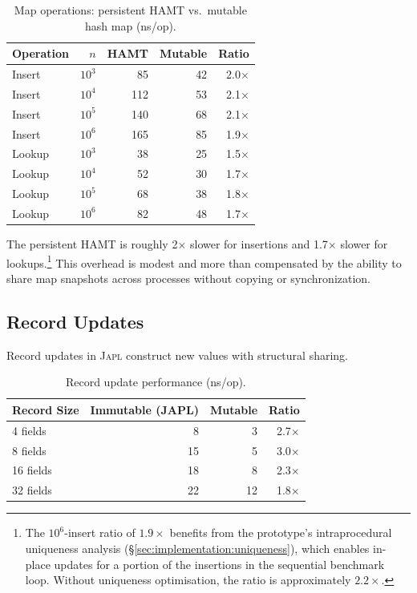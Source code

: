 \documentclass[11pt]{article}
\theoremstyle{definition}
\theoremstyle{remark}
\newcommand{\japl}{\textsc{Japl}}
\begin{document}
\begin{table}[H]
\centering
\caption{Map operations: persistent HAMT vs.\ mutable hash map (ns/op).}
\label{tab:map-benchmark}
\begin{tabular}{lrrrr}
\toprule
\textbf{Operation} & \textbf{$n$} & \textbf{HAMT} & \textbf{Mutable} & \textbf{Ratio} \\
\midrule
Insert    & $10^3$  & 85    & 42    & 2.0$\times$ \\
Insert    & $10^4$  & 112   & 53    & 2.1$\times$ \\
Insert    & $10^5$  & 140   & 68    & 2.1$\times$ \\
Insert    & $10^6$  & 165   & 85    & 1.9$\times$ \\
Lookup    & $10^3$  & 38    & 25    & 1.5$\times$ \\
Lookup    & $10^4$  & 52    & 30    & 1.7$\times$ \\
Lookup    & $10^5$  & 68    & 38    & 1.8$\times$ \\
Lookup    & $10^6$  & 82    & 48    & 1.7$\times$ \\
\bottomrule
\end{tabular}
\end{table}

The persistent HAMT is roughly 2$\times$ slower for insertions and
1.7$\times$ slower for lookups.\footnote{The $10^6$-insert ratio of
$1.9\times$ benefits from the prototype's intraprocedural uniqueness
analysis (\S\ref{sec:implementation:uniqueness}), which enables
in-place updates for a portion of the insertions in the sequential
benchmark loop.  Without uniqueness optimisation, the ratio is
approximately $2.2\times$.}  This overhead is modest and more than
compensated by the ability to share map snapshots across processes
without copying or synchronization.

\subsection{Record Updates}
\label{sec:eval:records}

Record updates in \japl{} construct new values with structural
sharing.

\begin{table}[H]
\centering
\caption{Record update performance (ns/op).}
\label{tab:record-benchmark}
\begin{tabular}{lrrr}
\toprule
\textbf{Record Size} & \textbf{Immutable (JAPL)} & \textbf{Mutable} & \textbf{Ratio} \\
\midrule
4 fields   & 8    & 3    & 2.7$\times$ \\
8 fields   & 15   & 5    & 3.0$\times$ \\
16 fields  & 18   & 8    & 2.3$\times$ \\
32 fields  & 22   & 12   & 1.8$\times$ \\
\bottomrule
\end{tabular}
\end{table}
\end{document}
